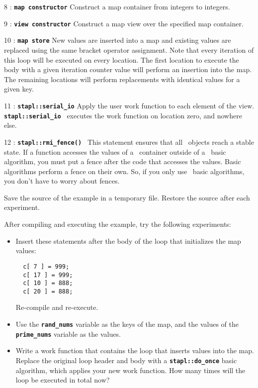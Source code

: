 \documentclass{report}
\begin{document}
\begin{hashitemize}
\item 8 : \texttt{{\bf map constructor}}
\newline
Construct a map container from integers to integers.

\item 9 : \texttt{{\bf view constructor}}
\newline
Construct a map view over the specified map container.

\item 10 : \texttt{{\bf map store}}
\newline
New values are inserted into a map and existing values are replaced
using the same bracket operator assignment.  Note that every iteration
of this loop will be executed on every location.  The first location
to execute the body with a given iteration counter value will perform
an insertion into the map.  The remaining locations will perform
replacements with identical values for a given key.

\item 11 : \texttt{{\bf stapl::serial\_io}}
\newline
Apply the user work function to each element of the view.
\texttt{{\bf stapl::serial\_io }}
executes the work function on location zero, and nowhere else.

\item 12 : \texttt{{\bf stapl::rmi\_fence() }}
\newline
This statement ensures that all \stapl\ objects reach a stable state.
If a function accesses the values of a \stapl\ container outside of a
\stapl\ basic algorithm, you must put a fence after the code that accesses
the values.  Basic algorithms perform a fence on their own.  So, if you
only use \stapl\ basic algorithms, you don't have to worry about fences.
\end{hashitemize}

Save the source of the example in a temporary file.
Restore the source after each experiment.

After compiling and executing the example, try the following experiments:
\begin{itemize}
\item
Insert these statements after the body of the loop that initializes
the map values:
\begin{verbatim}
  c[ 7 ] = 999;
  c[ 17 ] = 999;
  c[ 10 ] = 888;
  c[ 20 ] = 888;
\end{verbatim}
Re-compile and re-execute.
\item
Use the
\texttt{{\bf rand\_nums}}
variable as the keys of the map,
and the values of the
\texttt{{\bf prime\_nums}}
variable as the values.
\item
Write a work function that contains the loop that inserts values into
the map.  Replace the original loop header and body with a
\texttt{{\bf stapl::do\_once}}
basic algorithm, which applies your new
work function.  How many times will the loop be executed in total now?
\end{itemize}
\end{document}
